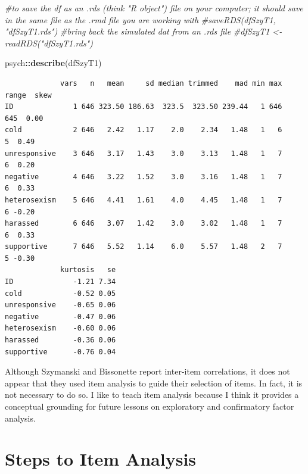 \documentclass[
  english,
]{book}
\newenvironment{Shaded}{\begin{snugshade}}{\end{snugshade}}
\newcommand{\CommentTok}[1]{\textcolor[rgb]{0.56,0.35,0.01}{\textit{#1}}}
\newcommand{\KeywordTok}[1]{\textcolor[rgb]{0.13,0.29,0.53}{\textbf{#1}}}
\newcommand{\NormalTok}[1]{#1}
\newcommand{\OperatorTok}[1]{\textcolor[rgb]{0.81,0.36,0.00}{\textbf{#1}}}
\begin{document}
\begin{Shaded}
\begin{Highlighting}[]
\CommentTok{#to save the df as an .rds (think "R object") file on your computer; it should save in the same file as the .rmd file you are working with}
\CommentTok{#saveRDS(dfSzyT1, "dfSzyT1.rds")}
\CommentTok{#bring back the simulated dat from an .rds file}
\CommentTok{#dfSzyT1 <- readRDS("dfSzyT1.rds")}
\end{Highlighting}
\end{Shaded}

\begin{Shaded}
\begin{Highlighting}[]
\NormalTok{psych}\OperatorTok{::}\KeywordTok{describe}\NormalTok{(dfSzyT1)}
\end{Highlighting}
\end{Shaded}

\begin{verbatim}
             vars   n   mean     sd median trimmed    mad min max range  skew
ID              1 646 323.50 186.63  323.5  323.50 239.44   1 646   645  0.00
cold            2 646   2.42   1.17    2.0    2.34   1.48   1   6     5  0.49
unresponsive    3 646   3.17   1.43    3.0    3.13   1.48   1   7     6  0.20
negative        4 646   3.22   1.52    3.0    3.16   1.48   1   7     6  0.33
heterosexism    5 646   4.41   1.61    4.0    4.45   1.48   1   7     6 -0.20
harassed        6 646   3.07   1.42    3.0    3.02   1.48   1   7     6  0.33
supportive      7 646   5.52   1.14    6.0    5.57   1.48   2   7     5 -0.30
             kurtosis   se
ID              -1.21 7.34
cold            -0.52 0.05
unresponsive    -0.65 0.06
negative        -0.47 0.06
heterosexism    -0.60 0.06
harassed        -0.36 0.06
supportive      -0.76 0.04
\end{verbatim}

Although Szymanski and Bissonette report inter-item correlations, it does not appear that they used item analysis to guide their selection of items. In fact, it is not necessary to do so. I like to teach item analysis because I think it provides a conceptual grounding for future lessons on exploratory and confirmatory factor analysis.

\hypertarget{steps-to-item-analysis}{%
\section{Steps to Item Analysis}\label{steps-to-item-analysis}}
\end{document}
